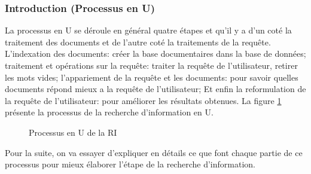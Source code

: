 \subsubsection{Introduction (Processus en U)}
La processus en U se déroule en général quatre étapes \citep{modern-ir} et qu'il y a d'un coté la traitement des documents et de l'autre coté la traitements de la requête. L'indexation des documents: créer la base documentaires dans la base de données; traitement et opérations sur la requête: traiter la requête de l'utilisateur, retirer les mots vides; l'appariement de la requête et les documents: pour savoir quelles documents répond mieux a la requête de l'utilisateur; Et enfin la reformulation de la requête de l'utilisateur: pour améliorer les résultats obtenues. La figure \ref{processus-u} présente la processus de la recherche d'information en U.

\begin{figure}[htbp]
    \begin{center}
        \caption{Processus en U de la RI \citep{thesaurus-ir-web}}
    \end{center}
    \label{processus-u}
\end{figure}

Pour la suite, on va essayer d’expliquer en détails ce que font chaque partie de ce processus pour mieux élaborer l'étape de la recherche d'information.

